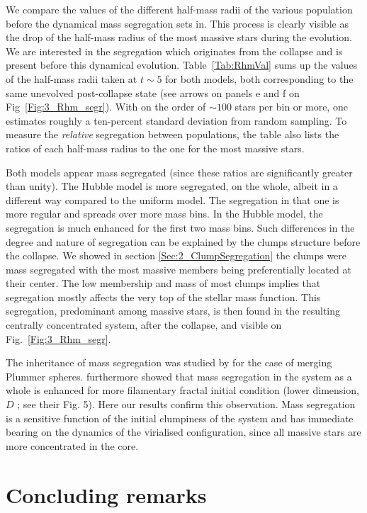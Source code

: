 We compare the values of the different half-mass radii of the various population before the dynamical mass segregation sets in. This process is clearly visible as the drop of the half-mass radius of the most massive stars during the evolution. We are interested in the segregation which originates from the collapse and is present before this dynamical evolution. Table~\ref{Tab:RhmVal} sums up the values of the half-mass radii taken at $t\sim5$ for both models, both corresponding to the same unevolved post-collapse state (see arrows on panels e and f on Fig~\ref{Fig:3_Rhm_segr}). With on the order of $\sim 100$ stars per bin or more, one estimates roughly a ten-percent standard deviation from random sampling. To measure the \textit{relative} segregation between populations, the table also lists the ratios of each half-mass radius to the one for the most massive stars. 

Both models appear mass segregated (since these ratios are significantly greater than unity). The Hubble model is more segregated, on the whole, albeit in a different way compared to the uniform model. The segregation in that one is more regular and spreads over more mass bins. In the Hubble model, the segregation is much enhanced for the first two mass bins. Such differences in the degree and nature of segregation can be explained by the clumps structure before the collapse. We showed in section \ref{Sec:2_ClumpSegregation} the clumps were mass segregated with the most massive members being preferentially located at their center. The low membership and mass of most clumps implies that segregation mostly affects the very top of the stellar mass function. This segregation, predominant among massive stars, is then found in the resulting centrally concentrated system, after the collapse, and visible on Fig.~\ref{Fig:3_Rhm_segr}. 

The inheritance of mass segregation was studied by \cite{McMillan2007} for the case of merging Plummer spheres. \cite{Allison2010} furthermore showed that mass segregation in the system as a whole is enhanced for more filamentary  fractal initial condition (lower dimension, $D$ ; see their Fig. 5). Here our results confirm this observation. Mass segregation is a sensitive function of the initial clumpiness of the system and has immediate bearing on the dynamics of the virialised configuration, since all massive stars are more concentrated in the core.


\section{Concluding remarks}


